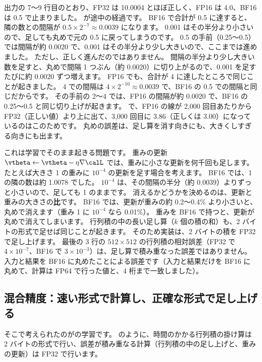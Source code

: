 出力の 7〜9 行目のとおり、FP32 は 10.0004 とほぼ正しく、FP16 は 4.0、BF16 は 0.5 で止まりました。
が途中の経過です。
BF16 で合計が 0.5 に達すると、隣の数との間隔が $0.5\times2^{-7}\approx0.0039$ になります。
0.001 はその半分より小さいので、足しても丸めで元の 0.5 に戻ってしまうのです。
0.5 の手前（0.25〜0.5）では間隔が約 0.0020 で、0.001 はその半分より少し大きいので、ここまでは進めました。
ただし、正しく進んだのではありません。
間隔の半分より少し大きい数を足すと、丸めで間隔 1 つぶん（約 0.0020）に切り上がるので、0.001 を足すたびに約 0.0020 ずつ増えます。
FP16 でも、合計が 4 に達したところで同じことが起きました。
4 での間隔は $4\times2^{-10}\approx0.0039$ で、BF16 の 0.5 での間隔と同じだからです。
その手前の 2〜4 では、FP16 の間隔が約 0.0020 で、BF16 の 0.25〜0.5 と同じ切り上げが起きます。
で、FP16 の線が 2,000 回目あたりから FP32（正しい値）より上に出て、3,000 回目に 3.86（正しくは 3.00）になっているのはこのためです。
丸めの誤差は、足し算を消す向きにも、大きくしすぎる向きにも出ます。


これは学習でそのまま起きる問題です。
重みの更新 $\vtheta\leftarrow\vtheta-\eta\nabla\calL$ では、重みに小さな更新を何千回も足します。
たとえば大きさ 1 の重みに $10^{-4}$ の更新を足す場合を考えます。
BF16 では、1 の隣の数は約 1.0078 でした。
$10^{-4}$ は、その間隔の半分（約 0.0039）よりずっと小さいので、足しても 1 のままです。
消えるかどうかを決めるのは、更新と重みの大きさの\textbf{比}です。
BF16 では、更新が重みの約 0.2〜0.4\% より小さいと、丸めで消えます（重み 1 に $10^{-4}$ なら 0.01\%）。
重みを BF16 で持つと、更新が丸めで消えてしまいます。
行列積の中の長い足し算（$k$ 個の積の和）も、2 バイトの形式で足せば同じことが起きます。
そのため実装は、2 バイトの積を FP32 で足し上げます。
最後の 3 行の $512\times512$ の行列積の相対誤差（FP32 で $4\times10^{-7}$、BF16 で $3\times10^{-3}$）は、足し算で積み重なった誤差ではありません。
入力と結果を BF16 に丸めたことによる誤差です（入力と結果だけを BF16 に丸めて、計算は FP64 で行った値と、4 桁まで一致しました）。

\subsection*{混合精度：速い形式で計算し、正確な形式で足し上げる}

そこで考えられたのがの学習です\cite{micikevicius2018mixed}。
のように、時間のかかる行列積の掛け算は 2 バイトの形式で行い、誤差が積み重なる計算（行列積の中の足し上げと、重みの更新）は FP32 で行います。

